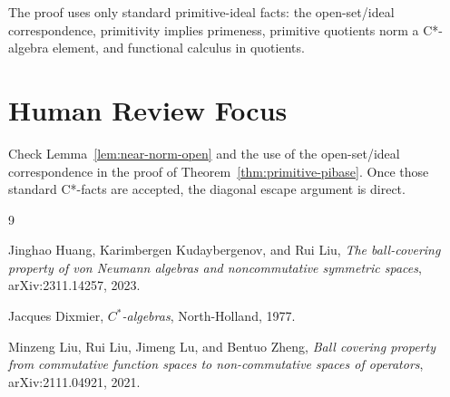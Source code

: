 \documentclass[11pt]{article}
\begin{document}
The proof uses only standard primitive-ideal facts: the open-set/ideal
correspondence, primitivity implies primeness, primitive quotients norm a
C*-algebra element, and functional calculus in quotients.

\section*{Human Review Focus}

Check Lemma~\ref{lem:near-norm-open} and the use of the open-set/ideal
correspondence in the proof of Theorem~\ref{thm:primitive-pibase}.  Once those
standard C*-facts are accepted, the diagonal escape argument is direct.

\begin{thebibliography}{9}

Jinghao Huang, Karimbergen Kudaybergenov, and Rui Liu,
\emph{The ball-covering property of von Neumann algebras and noncommutative
symmetric spaces},
arXiv:2311.14257, 2023.

Jacques Dixmier,
\emph{\(C^*\)-algebras},
North-Holland, 1977.

Minzeng Liu, Rui Liu, Jimeng Lu, and Bentuo Zheng,
\emph{Ball covering property from commutative function spaces to
non-commutative spaces of operators},
arXiv:2111.04921, 2021.

\end{thebibliography}
\end{document}
